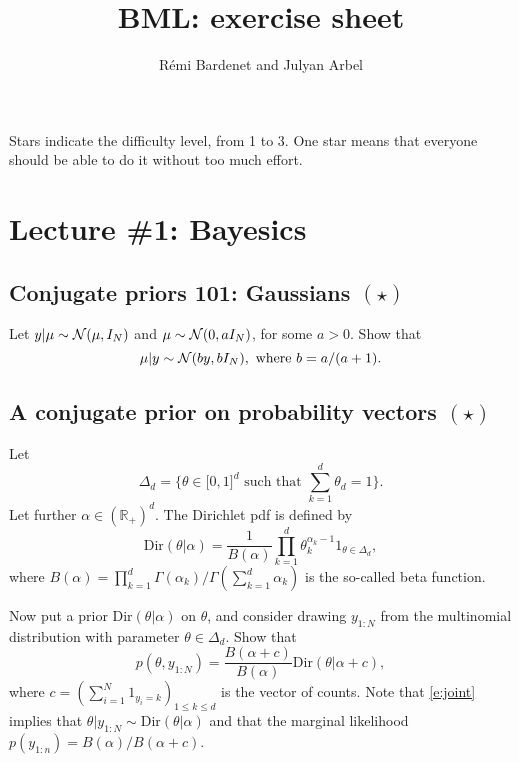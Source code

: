 \documentclass{article}
\title{BML: exercise sheet}
\date{}
\author{R\'emi Bardenet and Julyan Arbel}
\newif\ifsolutions
\newcommand\solution[1]{
\ifsolutions
\begin{mdframed}[style=MyFrame]
\textcolor{bleu}{\textbf{Solution:} #1}
\end{mdframed}
\fi
}
\begin{document}
\maketitle

Stars indicate the difficulty level, from 1 to 3. One star means that everyone should be able to do it without too much effort.

\tableofcontents

\section{Lecture \#1: Bayesics}

\subsection{Conjugate priors 101: Gaussians $(\star)$}
\label{s:gaussianConjugacy}
Let $y\vert\mu \sim \mathcal{N}(\mu,I_N)$ and $\mu\sim \mathcal{N}(0,a I_N)$, for some $a>0$. Show that
\begin{equation}
  \mu\vert y \sim \mathcal{N}(b y,bI_N), \text{ where } b=a/(a+1).
  \label{e:gaussianConjugacy}
\end{equation}

\solution{
We apply Bayes' theorem and keep track of only the terms that will not end up in the normalization constant of the posterior. This gives
\begin{align*}
  \log p(\mu\vert y) &\propto \log p(y\vert\mu) + \log p(\mu)\\
  &\propto - \frac{\Vert y-\mu\Vert^2}{2} - \frac{\Vert \mu\Vert^2}{2a}\\
  & \propto -\frac12 \Vert\mu\Vert^2\left(1+\frac1a \right) + y^T\mu\\
  & \propto - \frac{\Vert \mu - by\Vert^2}{2b}.
\end{align*}
}

\subsection{A conjugate prior on probability vectors $(\star)$}
Let
$$
\Delta_d = \{\theta\in\mathbb[0,1]^d \text{ such that } \sum_{k=1}^d \theta_d = 1\}.
$$
Let further $\alpha\in(\mathbb{R}_+)^d$. The Dirichlet pdf is defined by
 $$
 \text{Dir}(\theta\vert \alpha) = \frac{1}{B(\alpha)} \prod_{k=1}^d \theta_k^{\alpha_k -1} 1_{\theta\in \Delta_d},$$
where
 $ B(\alpha) = \prod_{k=1}^d \Gamma(\alpha_k) / \Gamma(\sum_{k=1}^d \alpha_k)$
 is the so-called beta function.

 Now put a prior $\text{Dir}(\theta\vert \alpha)$ on $\theta$, and consider drawing $y_{1:N}$ from the multinomial distribution with parameter $\theta\in\Delta_d$. Show that
 \begin{equation}
   p(\theta, y_{1:N}) = \frac{B(\alpha+c)}{B(\alpha)} \text{Dir}(\theta\vert \alpha + c),
\label{e:joint}
 \end{equation}
 where $c=(\sum_{i=1}^N 1_{y_i=k})_{1\leq k \leq d}$ is the vector of counts. Note that \eqref{e:joint} implies that $\theta\vert y_{1:N} \sim \text{Dir}(\theta\vert \alpha)$ and that the marginal likelihood $p(y_{1:n}) = B(\alpha)/B(\alpha+c)$.
\end{document}
